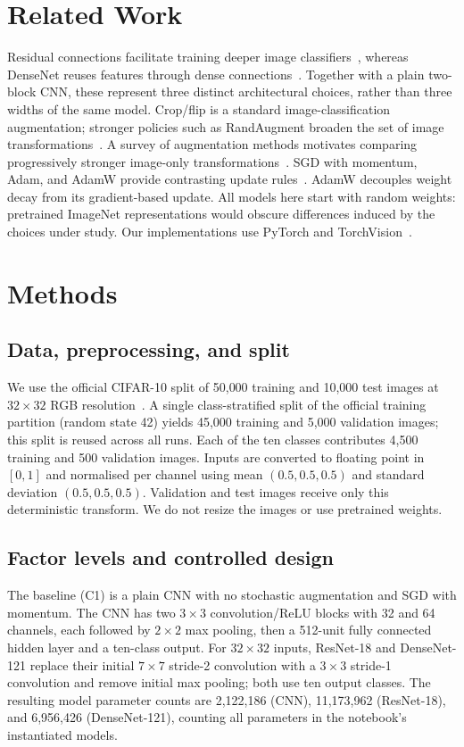 \documentclass[conference,onecolumn]{IEEEtran}
\begin{document}
\section{Related Work}
Residual connections facilitate training deeper image classifiers~\cite{resnet},
whereas DenseNet reuses features through dense connections~\cite{densenet}.
Together with a plain two-block CNN, these represent three distinct
architectural choices, rather than three widths of the same model.
Crop/flip is a standard image-classification augmentation; stronger policies
such as RandAugment broaden the set of image transformations~\cite{randaugment}.
A survey of augmentation methods motivates comparing progressively stronger
image-only transformations~\cite{augmentation_survey}. SGD with momentum,
Adam, and AdamW provide contrasting update rules~\cite{momentum,adam,adamw}.
AdamW decouples weight decay from its gradient-based update. All models here
start with random weights: pretrained ImageNet representations would obscure
differences induced by the choices under study. Our implementations use
PyTorch and TorchVision~\cite{pytorch,torchvision}.

\section{Methods}
\subsection{Data, preprocessing, and split}
We use the official CIFAR-10 split of 50,000 training and 10,000 test images
at $32\times32$ RGB resolution~\cite{cifar10}. A single class-stratified
split of the official training partition (random state 42) yields 45,000
training and 5,000 validation images; this split is reused across all runs.
Each of the ten classes contributes 4,500 training and 500 validation
images. Inputs are converted to floating point in $[0,1]$ and normalised
per channel using mean $(0.5,0.5,0.5)$ and standard deviation
$(0.5,0.5,0.5)$. Validation and test images receive only this deterministic
transform. We do not resize the images or use pretrained weights.

\subsection{Factor levels and controlled design}
The baseline (C1) is a plain CNN with no stochastic augmentation and SGD
with momentum. The CNN has two $3\times3$ convolution/ReLU blocks with
32 and 64 channels, each followed by $2\times2$ max pooling, then a
512-unit fully connected hidden layer and a ten-class output. For $32\times32$
inputs, ResNet-18 and DenseNet-121 replace their initial $7\times7$
stride-2 convolution with a $3\times3$ stride-1 convolution and remove
initial max pooling; both use ten output classes. The resulting model
parameter counts are 2,122,186 (CNN), 11,173,962 (ResNet-18), and
6,956,426 (DenseNet-121), counting all parameters in the notebook's
instantiated models.
\end{document}
